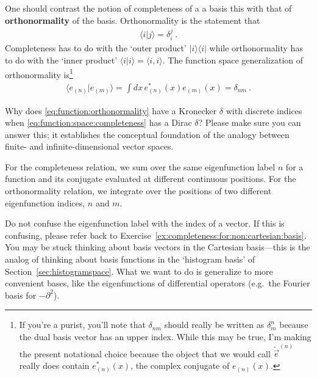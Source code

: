 One should contrast the notion of completeness of a a basis this with that of \textbf{orthonormality} of the basis. Orthonormality is the statement that
\begin{align}
	\langle i | j \rangle = \delta^j_i \ .
\end{align}
Completeness has to do with the `outer product' $|i\rangle \langle i|$ while orthonormality has to do with the `inner product' $\langle i | i\rangle = \langle i, i\rangle$. The function space generalization of orthonormality is\footnote{If you're a purist, you'll note that $\delta_{nm}$ should really be written as $\delta^n_m$ because the dual basis vector has an upper index. While this may be true, I'm making the present notational choice because the object that we would call $\tilde{\vec{e}}^{(n)}$ really does contain $e_{(n)}^*(x)$, the complex conjugate of $e_{(n)}(x)$.}
\begin{align}
	\langle e_{(n)} | e_{(m)} \rangle = \int dx \, e_{(n)}^*(x) e_{(m)}(x) = \delta_{nm} \ .
	\label{eq:function:orthonormality}
\end{align}
\begin{exercise}
Why does \eqref{eq:function:orthonormality} have a Kronecker $\delta$ with discrete indices when \eqref{eq:function:space:completeness} has a Dirac $\delta$? Please make sure you can answer this; it establishes the conceptual foundation of the analogy between finite- and infinite-dimensional vector spaces.
\end{exercise}
For the completeness relation, we sum over the same eigenfunction label $n$ for a function and its conjugate evaluated at different continuous positions. For the orthonormality relation, we integrate over the positions of two different eigenfunction indices, $n$ and $m$. 

Do not confuse the eigenfunction label with the index of a vector. If this is confusing, please refer back to Exercise~\ref{ex:completeness:for:non:cartesian:basis}. You may be stuck thinking about basis vectors in the Cartesian basis---this is the analog of thinking about basis functions in the `histogram basis' of Section~\ref{sec:histogramspace}. What we want to do is generalize to more convenient bases, like the eigenfunctions of differential operators (e.g.~the Fourier basis for $-\partial^2$).

